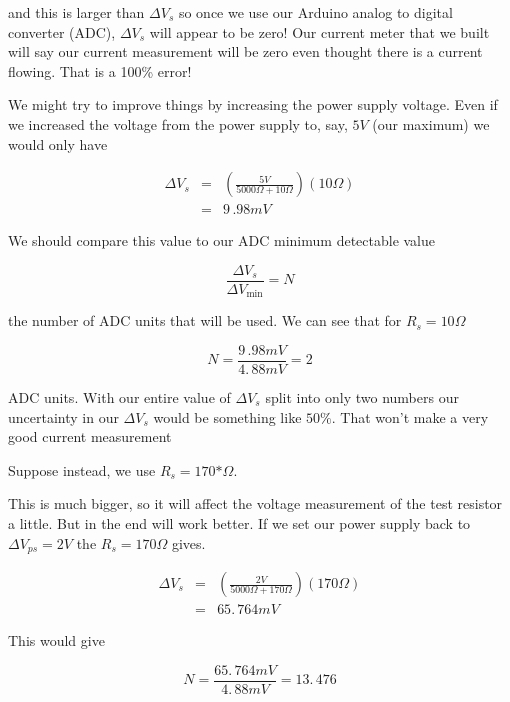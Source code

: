 \noindent and this is larger than $\Delta V_{s}$ so once we use our Arduino analog to digital converter (ADC), $\Delta V_{s}$ will appear to be zero! Our current meter that we built will say our current measurement will be zero even thought there is a current flowing. That is a 100\% error!

We might try to improve things by increasing the power supply voltage. Even
if we increased the voltage from the power supply to, say, $5\unit{V}$ (our
maximum) we would only have 

\begin{eqnarray*}
	\Delta V_{s}   &=&\left(\frac{5\unit{V}}{5000\unit{\Omega}+10\unit{\Omega}}\right) \left( 10\unit{\Omega}\right) \\
    &=&9\,.98\unit{mV}
\end{eqnarray*}

We should compare this value to our ADC minimum detectable value 

\begin{equation*}
	\frac{\Delta V_{s}}{\Delta V_{\min }}=N
\end{equation*}

\noindent the number of ADC units that will be used. We can see that for $R_{s}=10\unit{\Omega}$ 

\begin{equation*}
	N=\frac{9\,.98\unit{mV}}{4.\,\allowbreak 88\unit{mV}}=2
\end{equation*}

\noindent ADC units. With our entire value of $\Delta V_{s}$ split into only two numbers our uncertainty in our $\Delta V_{s}$ would be something like $50\%.$ That won't make a very good current measurement

Suppose instead, we use $R_{s}=170\unit{*\Omega}.$ 

\noindent This is much bigger, so it will affect the voltage measurement of the test resistor a little. But in the end will work better. If we set our power supply back to $\Delta V_{ps}=2\unit{V}$ the $R_{s}=170\unit{\Omega}$ gives. 

\begin{eqnarray*}
	\Delta V_{s} &=&\left( \frac{2\unit{V}}{5000\unit{\Omega}+170\unit{\Omega}}\right) \left( 170\unit{\Omega}\right) \\
                 &=&65.\,\allowbreak 764\unit{mV}
\end{eqnarray*}

\noindent This would give 

\begin{equation*}
	N=\frac{65.\,\allowbreak 764\unit{mV}}{4.\,\allowbreak 88\unit{mV}}=13.\,\allowbreak 476
\end{equation*}

